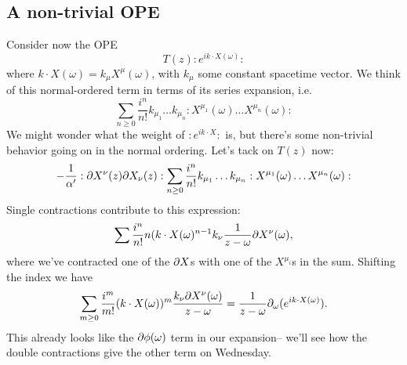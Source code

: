\subsection*{A non-trivial OPE} Consider now the OPE
\begin{equation}
    T(z) :e^{ik \cdot X(\omega)}:
\end{equation}
where $k\cdot X(\omega) = k_\mu X^\mu(\omega)$, with $k_\mu$ some constant spacetime vector. We think of this normal-ordered term in terms of its series expansion, i.e.
\begin{equation}
    \sum_{n\geq 0} \frac{i^n}{n!} k_{\mu_1} \ldots k_{\mu_n} :X^{\mu_1}(\omega) \ldots X^{\mu_n}(\omega):
\end{equation}
We might wonder what the weight of $:e^{ik\cdot X}:$ is, but there's some non-trivial behavior going on in the normal ordering. Let's tack on $T(z)$ now:
\begin{equation}
    -\frac{1}{\alpha'} :\partial X^\nu(z) \partial X_\nu(z): \sum_{n\geq 0} \frac{i^n}{n!} k_{\mu_1} \ldots k_{\mu_n} :X^{\mu_1}(\omega) \ldots X^{\mu_n}(\omega):
\end{equation}
Single contractions contribute to this expression:
\begin{equation}
    \sum \frac{i^n}{n!} n(k\cdot X(\omega)^{n-1} k_\nu \frac{1}{z-\omega}\partial X^\nu(\omega),
\end{equation}
where we've contracted one of the $\partial X$s with one of the $X^{\mu_i}$s in the sum. Shifting the index we have
\begin{equation}
    \sum_{m\geq 0} \frac{i^m}{m!} (k\cdot X(\omega))^m \frac{k_\nu \partial X^\nu(\omega)}{z-\omega} = \frac{1}{z-\omega} \partial_\omega (e^{ik\cdot X(\omega)}).
\end{equation}
This already looks like the $\partial\phi(\omega)$ term in our expansion-- we'll see how the double contractions give the other term on Wednesday.